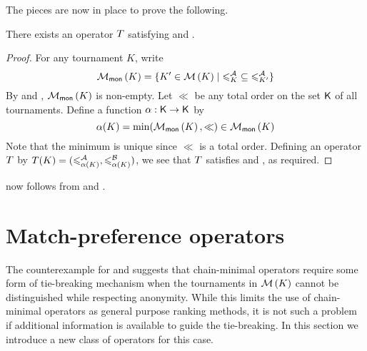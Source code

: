 The pieces are now in place to prove the following.

\begin{proposition}
    \label{tourn_result_chainmin_mon_compatibility}
    There exists an operator $T$ satisfying \chainmin{} and
    \mon{}.
\end{proposition}

\begin{proof}
    For any tournament $K$, write
    \[
        \operatorname{\mathcal{M}}_{\mathsf{mon}}\left({K}\right) = \{
            K' \in \operatorname{\mathcal{M}}\left({K}\right) \mid {\leqslant^{\mathcal{A}}_K} \subseteq {\leqslant^{\mathcal{A}}_{K'}}
        \}
    \]
    By  and
    , $\operatorname{\mathcal{M}}_{\mathsf{mon}}\left({K}\right)$ is non-empty. Let
    $\ll$ be any total order on the set $\mathsf{K}$ of all tournaments.
    Define a function $\alpha: \mathsf{K} \to \mathsf{K}$ by
    \[
        \alpha(K) = \min(\operatorname{\mathcal{M}}_{\mathsf{mon}}\left({K}\right), {\ll}) \in \operatorname{\mathcal{M}}_{\mathsf{mon}}\left({K}\right)
    \]
    Note that the minimum is unique since ${\ll}$ is a total order. Defining an
    operator $T$ by $T(K) = ({\leqslant^{\mathcal{A}}_{\alpha(K)}}, {\leqslant^{\mathcal{B}}_{\alpha(K)}})$,
    we see that $T$ satisfies \chainmin{} and \mon{}, as
    required.
\end{proof}

 now follows from
 and
.

\section{Match-preference operators}
\label{tourn_sec_match_preference_operators}


The counterexample for \chainmin{} and \anon{} suggests that
chain-minimal operators require some form of tie-breaking mechanism when the
tournaments in $\operatorname{\mathcal{M}}\left({K}\right)$ cannot be distinguished while respecting anonymity.
While this limits the use of chain-minimal operators as general purpose ranking
methods, it is not such a problem if additional information is available to
guide the tie-breaking. In this section we introduce a new class of operators
for this case.

